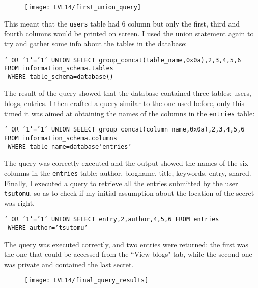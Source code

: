 \documentclass[12pt,a4paper]{article}
\begin{document}
	\begin{figure}[H]
	\centering
	\texttt{[image: LVL14/first\_union\_query]}
	\label{fig:firstunion}
	\end{figure}
	This meant that the \texttt{users} table had 6 column but only the first, third and fourth columns would be printed on screen. I used the union statement again to try and gather some info about the tables in the database:
	\begin{center}
		\texttt{' OR '1'='1' UNION SELECT group\_concat(table\_name,0x0a),2,3,4,5,6}\\ \texttt{FROM information\_schema.tables}\\ \texttt{ WHERE table\_schema=database() -- }
	\end{center}
 	The result of the query showed that the database contained three tables: users, blogs, entries.\newpage
	I then crafted a query similar to the one used before, only this timed it was aimed at obtaining the names of the columns in the \texttt{entries} table:
		\begin{center}
		\texttt{' OR '1'='1' UNION SELECT group\_concat(column\_name,0x0a),2,3,4,5,6}\\ \texttt{FROM information\_schema.columns}\\ \texttt{ WHERE table\_name=database'entries' -- }
	\end{center}
	The query was correctly executed and the output showed the names of the six columns in the \texttt{entries} table: author, blogname, title, keywords, entry, shared.
	Finally, I executed a query to retrieve all the entries submitted by the user \texttt{tsutomu}, so as to check if my initial assumption about the location of the secret was right.
	\begin{center}
		\texttt{' OR '1'='1' UNION SELECT entry,2,author,4,5,6 FROM entries}\\ \texttt{ WHERE author='tsutomu' -- }
	\end{center}
	The query was executed correctly, and two entries were returned: the first was the one that could be accessed from the ``View blogs" tab, while the second one was private and contained the last secret. 
	\begin{figure}[H]
		\centering
		\texttt{[image: LVL14/final\_query\_results]}
		\label{fig:finalqueryresult}
	\end{figure}


	
	
\end{document}
